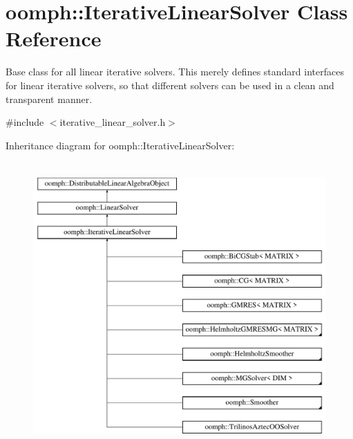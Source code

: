 \hypertarget{classoomph_1_1IterativeLinearSolver}{}\section{oomph\+:\+:Iterative\+Linear\+Solver Class Reference}
\label{classoomph_1_1IterativeLinearSolver}


Base class for all linear iterative solvers. This merely defines standard interfaces for linear iterative solvers, so that different solvers can be used in a clean and transparent manner.  




{\ttfamily \#include $<$iterative\+\_\+linear\+\_\+solver.\+h$>$}

Inheritance diagram for oomph\+:\+:Iterative\+Linear\+Solver\+:\begin{figure}[H]
\begin{center}
\leavevmode
\includegraphics[height=11.000000cm]{classoomph_1_1IterativeLinearSolver}
\end{center}
\end{figure}
